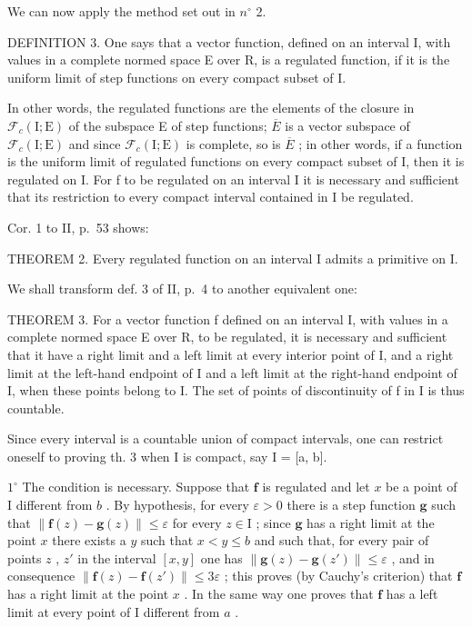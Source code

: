 We can now apply the method set out in \(n^{\circ}\) 2.

DEFINITION 3. One says that a vector function, defined on an interval I, with values in a complete normed space E over R, is a regulated function, if it is the uniform limit of step functions on every compact subset of I.

In other words, the regulated functions are the elements of the closure in \(\mathcal{F}_{c}(\mathrm{I};\mathrm{E})\) of the subspace E of step functions; \(\overline{E}\) is a vector subspace of \(\mathcal{F}_{c}(\mathrm{I};\mathrm{E})\) and since \(\mathcal{F}_{c}(\mathrm{I};\mathrm{E})\) is complete, so is \(\overline{E}\) ; in other words, if a function is the uniform limit of regulated functions on every compact subset of I, then it is regulated on I. For f to be regulated on an interval I it is necessary and sufficient that its restriction to every compact interval contained in I be regulated.

Cor. 1 to II, p.~53 shows:

THEOREM 2. Every regulated function on an interval I admits a primitive on I.

We shall transform def. 3 of II, p.~4 to another equivalent one:

THEOREM 3. For a vector function f defined on an interval I, with values in a complete normed space E over R, to be regulated, it is necessary and sufficient that it have a right limit and a left limit at every interior point of I, and a right limit at the left-hand endpoint of I and a left limit at the right-hand endpoint of I, when these points belong to I. The set of points of discontinuity of f in I is thus countable.

Since every interval is a countable union of compact intervals, one can restrict oneself to proving th. 3 when I is compact, say I = {[}a, b{]}.

\(1^{\circ}\) The condition is necessary. Suppose that \(\mathbf{f}\) is regulated and let \(x\) be a point of I different from \(b\) . By hypothesis, for every \(\varepsilon > 0\) there is a step function \(\mathbf{g}\) such that \(\| \mathbf{f}(z) - \mathbf{g}(z) \| \leqslant \varepsilon\) for every \(z \in \mathrm{I}\) ; since \(\mathbf{g}\) has a right limit at the point \(x\) there exists a \(y\) such that \(x < y \leqslant b\) and such that, for every pair of points \(z\) , \(z'\) in the interval \([x, y]\) one has \(\| \mathbf{g}(z) - \mathbf{g}(z') \| \leqslant \varepsilon\) , and in consequence \(\| \mathbf{f}(z) - \mathbf{f}(z') \| \leqslant 3\varepsilon\) ; this proves (by Cauchy's criterion) that \(\mathbf{f}\) has a right limit at the point \(x\) . In the same way one proves that \(\mathbf{f}\) has a left limit at every point of I different from \(a\) .

